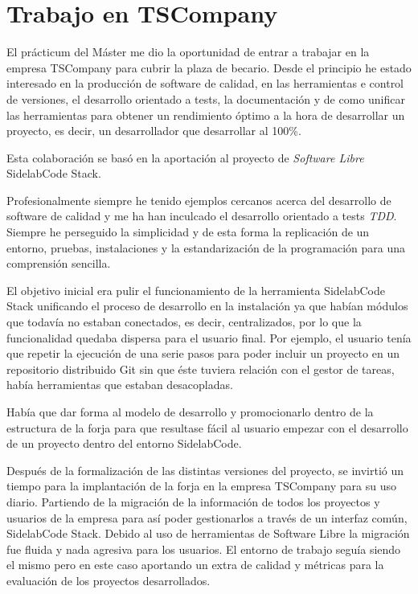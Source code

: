 
\section{Trabajo en TSCompany}
\label{sec:trabajo-tscompany}

\par El pr\'acticum del M\'aster me dio la oportunidad de entrar a trabajar en la empresa TSCompany para cubrir la plaza de becario. Desde el principio he estado interesado en la producción de software de calidad, en las herramientas e control de versiones, el desarrollo orientado a tests, la documentación y de como unificar las herramientas para obtener un rendimiento óptimo a la hora de desarrollar un proyecto, es decir, un desarrollador que desarrollar al 100\%.

\par Esta colaboraci\'on se bas\'o en la aportaci\'on al proyecto de \emph{Software Libre} SidelabCode Stack.

\par Profesionalmente siempre he tenido ejemplos cercanos acerca del desarrollo de software de calidad y me ha han inculcado el desarrollo orientado a tests \emph{TDD}. Siempre he perseguido la simplicidad y de esta forma la replicaci\'on de un entorno, pruebas, instalaciones y la estandarizaci\'on de la programaci\'on para una comprensi\'on sencilla.

\par El objetivo inicial era pulir el funcionamiento de la herramienta SidelabCode Stack unificando el proceso de desarrollo en la instalaci\'on ya que hab\'ian m\'odulos que todav\'ia no estaban conectados, es decir, centralizados, por lo que la funcionalidad quedaba dispersa para el usuario final. Por ejemplo, el usuario ten\'ia que repetir la ejecución de una serie pasos para poder incluir un proyecto en un repositorio distribuido Git sin que éste tuviera relación con el gestor de tareas, había herramientas que estaban desacopladas.

\par Hab\'ia que dar forma al modelo de desarrollo y promocionarlo dentro de la estructura de la forja para que resultase f\'acil al usuario empezar con el desarrollo de un proyecto dentro del entorno SidelabCode.

\par Despu\'es de la formalizaci\'on de las distintas versiones del proyecto, se invirti\'o un tiempo para la implantaci\'on de la forja en la empresa TSCompany para su uso diario. Partiendo de la migraci\'on de la informaci\'on de todos los proyectos y usuarios de la empresa para as\'i poder gestionarlos a trav\'es de un interfaz com\'un, SidelabCode Stack. Debido al uso de herramientas de Software Libre la migraci\'on fue fluida y nada agresiva para los usuarios. El entorno de trabajo segu\'ia siendo el mismo pero en este caso aportando un extra de calidad y m\'etricas para la evaluaci\'on de los proyectos desarrollados.

